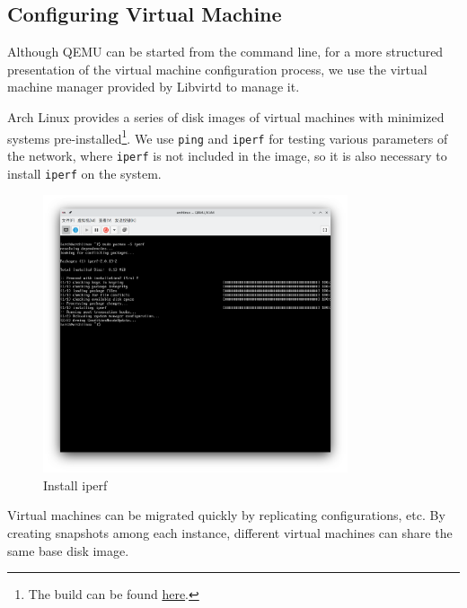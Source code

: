 \subsection*{Configuring Virtual Machine}

Although QEMU can be started from the command line, for a more structured presentation of the virtual machine configuration process, we use the virtual machine manager provided by Libvirtd to manage it.

Arch Linux provides a series of disk images of virtual machines with minimized systems pre-installed\footnote{The build can be found  \textcolor{blue}{\href{https://gitlab.archlinux.org/archlinux/arch-boxes/-/jobs/38089/artifacts/browse/output}{here}}.}. We use \texttt{ping} and \texttt{iperf} for testing various parameters of the network, where \texttt{iperf} is not included in the image, so it is also necessary to install \texttt{iperf} on the system.

\begin{figure}[ht]
    \centering
    \includegraphics[width=0.8\textwidth]{images/install_iperf.png}
    \caption{Install iperf}
    \label{fig:compile}
\end{figure}

Virtual machines can be migrated quickly by replicating configurations, etc. By creating snapshots among each instance, different virtual machines can share the same base disk image.